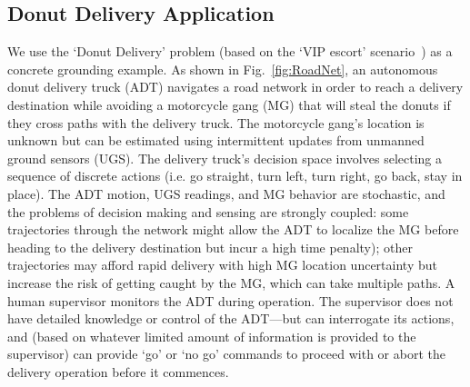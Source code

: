 \subsection{Donut Delivery Application} \label{sec:donut_delivery}
We use the `Donut Delivery' problem (based on the `VIP escort' scenario~\cite{Humphrey2012-lr}) as a concrete grounding example. As shown in Fig.~\ref{fig:RoadNet}, an autonomous donut delivery truck (ADT) navigates a road network in order to reach a delivery destination while avoiding a motorcycle gang (MG) that will steal the donuts if they cross paths with the delivery truck. The motorcycle gang's location is unknown but can be estimated using intermittent updates from unmanned ground sensors (UGS). The delivery truck's decision space involves selecting a sequence of discrete actions (i.e. go straight, turn left, turn right, go back, stay in place). The ADT motion, UGS readings, and MG behavior are stochastic, and the problems of decision making and sensing are strongly coupled: some trajectories through the network might allow the ADT to localize the MG before heading to the delivery destination but incur a high time penalty); other trajectories may afford rapid delivery with high MG location uncertainty but increase the risk of getting caught by the MG, which can take multiple paths. A human supervisor monitors the ADT during operation. The supervisor does not have detailed knowledge or control of the ADT---but can interrogate its actions, and (based on whatever limited amount of information is provided to the supervisor) can provide `go' or `no go' commands to proceed with or abort the delivery operation before it commences. 

